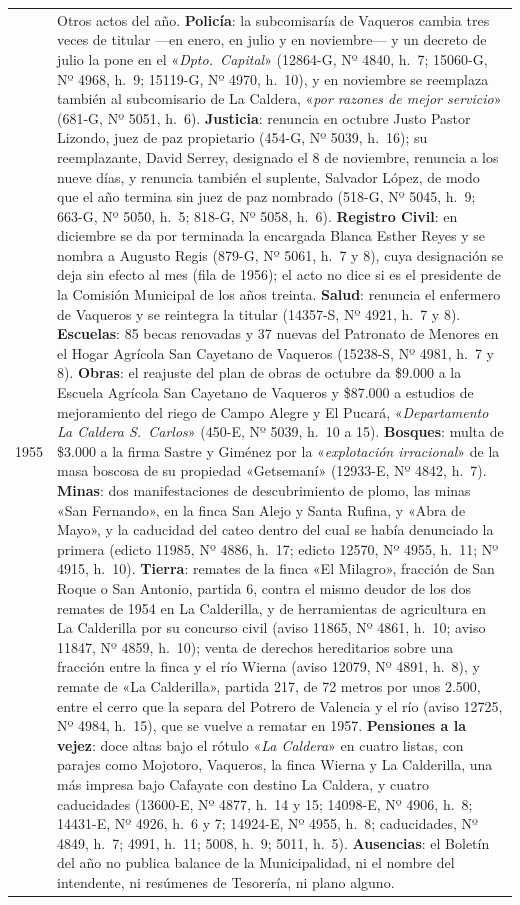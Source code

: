 \begin{longtable}{@{}p{2.7cm}p{10.3cm}@{}}
1955 & Otros actos del año. \textbf{Policía}: la subcomisaría de Vaqueros cambia tres veces de titular ---en enero, en julio y en noviembre--- y un decreto de julio la pone en el «\textit{Dpto.\ Capital}» (12864-G, Nº 4840, h.\ 7; 15060-G, Nº 4968, h.\ 9; 15119-G, Nº 4970, h.\ 10), y en noviembre se reemplaza también al subcomisario de La Caldera, «\textit{por razones de mejor servicio}» (681-G, Nº 5051, h.\ 6). \textbf{Justicia}: renuncia en octubre Justo Pastor Lizondo, juez de paz propietario (454-G, Nº 5039, h.\ 16); su reemplazante, David Serrey, designado el 8 de noviembre, renuncia a los nueve días, y renuncia también el suplente, Salvador López, de modo que el año termina sin juez de paz nombrado (518-G, Nº 5045, h.\ 9; 663-G, Nº 5050, h.\ 5; 818-G, Nº 5058, h.\ 6). \textbf{Registro Civil}: en diciembre se da por terminada la encargada Blanca Esther Reyes y se nombra a Augusto Regis (879-G, Nº 5061, h.\ 7 y 8), cuya designación se deja sin efecto al mes (fila de 1956); el acto no dice si es el presidente de la Comisión Municipal de los años treinta. \textbf{Salud}: renuncia el enfermero de Vaqueros y se reintegra la titular (14357-S, Nº 4921, h.\ 7 y 8). \textbf{Escuelas}: 85 becas renovadas y 37 nuevas del Patronato de Menores en el Hogar Agrícola San Cayetano de Vaqueros (15238-S, Nº 4981, h.\ 7 y 8). \textbf{Obras}: el reajuste del plan de obras de octubre da \$9.000 a la Escuela Agrícola San Cayetano de Vaqueros y \$87.000 a estudios de mejoramiento del riego de Campo Alegre y El Pucará, «\textit{Departamento La Caldera S.\ Carlos}» (450-E, Nº 5039, h.\ 10 a 15). \textbf{Bosques}: multa de \$3.000 a la firma Sastre y Giménez por la «\textit{explotación irracional}» de la masa boscosa de su propiedad «Getsemaní» (12933-E, Nº 4842, h.\ 7). \textbf{Minas}: dos manifestaciones de descubrimiento de plomo, las minas «San Fernando», en la finca San Alejo y Santa Rufina, y «Abra de Mayo», y la caducidad del cateo dentro del cual se había denunciado la primera (edicto 11985, Nº 4886, h.\ 17; edicto 12570, Nº 4955, h.\ 11; Nº 4915, h.\ 10). \textbf{Tierra}: remates de la finca «El Milagro», fracción de San Roque o San Antonio, partida 6, contra el mismo deudor de los dos remates de 1954 en La Calderilla, y de herramientas de agricultura en La Calderilla por su concurso civil (aviso 11865, Nº 4861, h.\ 10; aviso 11847, Nº 4859, h.\ 10); venta de derechos hereditarios sobre una fracción entre la finca y el río Wierna (aviso 12079, Nº 4891, h.\ 8), y remate de «La Calderilla», partida 217, de 72 metros por unos 2.500, entre el cerro que la separa del Potrero de Valencia y el río (aviso 12725, Nº 4984, h.\ 15), que se vuelve a rematar en 1957. \textbf{Pensiones a la vejez}: doce altas bajo el rótulo «\textit{La Caldera}» en cuatro listas, con parajes como Mojotoro, Vaqueros, la finca Wierna y La Calderilla, una más impresa bajo Cafayate con destino La Caldera, y cuatro caducidades (13600-E, Nº 4877, h.\ 14 y 15; 14098-E, Nº 4906, h.\ 8; 14431-E, Nº 4926, h.\ 6 y 7; 14924-E, Nº 4955, h.\ 8; caducidades, Nº 4849, h.\ 7; 4991, h.\ 11; 5008, h.\ 9; 5011, h.\ 5). \textbf{Ausencias}: el Boletín del año no publica balance de la Municipalidad, ni el nombre del intendente, ni resúmenes de Tesorería, ni plano alguno. \\

\end{longtable}
